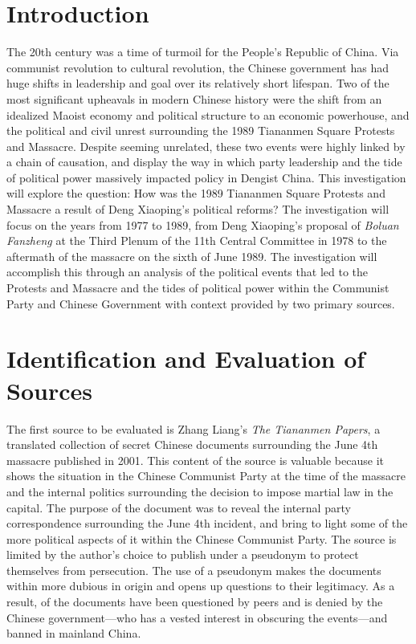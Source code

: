 \documentclass{paper}
\begin{document}
\insertTitlePage
\tableofcontents
\thispagestyle{empty}
\newpage
\setcounter{page}{1}
\onehalfspacing

\section{Introduction}
The 20th century was a time of turmoil for the People's Republic of China.
Via communist revolution to cultural revolution, the Chinese government has had huge shifts in leadership and goal over its relatively short lifespan.
Two of the most significant upheavals in modern Chinese history were the shift from an idealized Maoist economy and political structure to an economic powerhouse, and the political and civil unrest surrounding the 1989 Tiananmen Square Protests and Massacre.
Despite seeming unrelated, these two events were highly linked by a chain of causation, and display the way in which party leadership and the tide of political power massively impacted policy in Dengist China.
This investigation will explore the question: How was the 1989 Tiananmen Square Protests and Massacre a result of Deng Xiaoping's political reforms?
The investigation will focus on the years from 1977 to 1989, from Deng Xiaoping's proposal of \emph{Boluan Fanzheng} at the Third Plenum of the 11th Central Committee in 1978 to the aftermath of the massacre on the sixth of June 1989.
The investigation will accomplish this through an analysis of the political events that led to the Protests and Massacre and the tides of political power within the Communist Party and Chinese Government with context provided by two primary sources.

\section{Identification and Evaluation of Sources}
The first source to be evaluated is Zhang Liang's \textit{The Tiananmen Papers},\autocite{tiananmen} a translated collection of secret Chinese documents surrounding the June 4th massacre published in 2001.
This content of the source is valuable because it shows the situation in the Chinese Communist Party at the time of the massacre and the internal politics surrounding the decision to impose martial law in the capital.
The purpose of the document was to reveal the internal party correspondence surrounding the June 4th incident, and bring to light some of the more political aspects of it within the Chinese Communist Party.
The source is limited by the author's choice to publish under a pseudonym to protect themselves from persecution.
The use of a pseudonym makes the documents within more dubious in origin and opens up questions to their legitimacy.
As a result, of the documents have been questioned by peers and is denied by the Chinese government---who has a vested interest in obscuring the events---and banned in mainland China.
\end{document}
